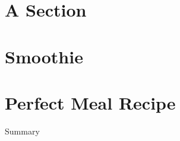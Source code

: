 

\section{A Section}
\enlargethispage{\baselineskip}


\section{Smoothie}

\newpage
\section{Perfect Meal Recipe}

Summary